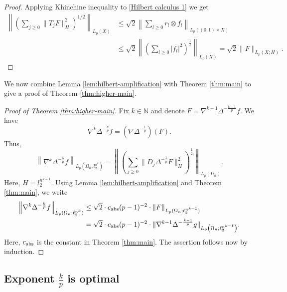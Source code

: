 \documentclass{amsart}
\numberwithin{equation}{section}
\theoremstyle{definition}
\theoremstyle{remark}
\newcommand{\1}{\mathbf 1}
\begin{document}
\begin{proof}
Applying Khinchine inequality to \eqref{Hilbert calculus 1} we get
\begin{align*}
\left\|\left(\sum_{j\geq0}\|T_jF\|_H^2\right)^{1/2}\right\|_{L_p(X)}&\leq \sqrt{2}\left\|\sum_{l\geq0}r_l\otimes f_l\right\|_{L_p((0,1)\times X)}\\
&\leq \sqrt{2}\left\|\left(\sum_{l\geq0}|f_l|^2\right)^{\frac{1}{2}}\right\|_{L_p(X)}=\sqrt{2}\|F\|_{L_{p}(X;H)}.
\end{align*}
\end{proof}

We now combine Lemma \ref{lem:hilbert-amplification} with Theorem \ref{thm:main} to give a proof of Theorem \ref{thm:higher-main}.
\begin{proof}[Proof of Theorem \ref{thm:higher-main}]
Fix $k\in\mathbb{N}$ and denote $F=\nabla^{k-1}\Delta^{-\frac{k-1}{p}}f.$ We have
$$\nabla^k\Delta^{-\frac{k}{p}}f=(\nabla\Delta^{-\frac1p})(F).$$
Thus,
$$
\left\|\nabla^k\Delta^{-\frac{k}{p}}f\right\|_{L_p(\Omega_n,l_2^{n^k})}=\left\|\left(\sum_{j\geq0}\|D_j\Delta^{-\frac1p}F\|_H^2\right)^{\frac12}\right\|_{L_p(\Omega_n)}.
$$
Here, $H=l_2^{n^{k-1}}.$ Using Lemma \ref{lem:hilbert-amplification} and Theorem \ref{thm:main}, we write
\begin{align*}
\left\|\nabla^k\Delta^{-\frac{k}{p}}f\right\|_{L_p(\Omega_n;\ell_2^{n^k})}&\leq \sqrt{2}\cdot c_{{\rm abs}}(p-1)^{-2}\cdot \|F\|_{L_p(\Omega_n;\ell_2^{n^{k-1}})}\\
&=\sqrt{2}\cdot c_{{\rm abs}}(p-1)^{-2}\cdot\|\nabla^{k-1}\Delta^{-\frac{k-1}{p}}g\|_{L_p\left(\Omega_n;\ell_2^{n^{k-1}}\right)}.
\end{align*}
Here, $c_{{\rm abs}}$ is the constant in Theorem \ref{thm:main}. The assertion follows now by induction.
\end{proof}

\subsection{Exponent $\frac{k}{p}$ is optimal}\label{optimality on exponent}
\end{document}
